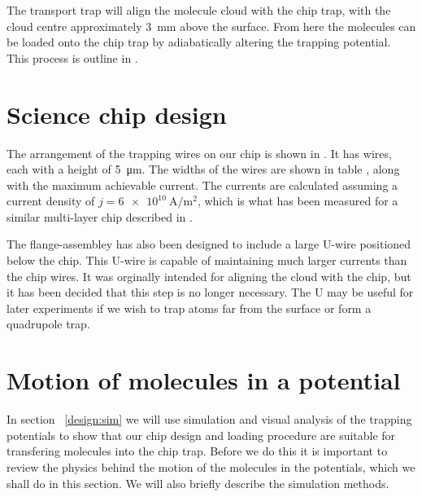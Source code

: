 
The transport trap will align the molecule cloud with the chip trap, with the
cloud centre approximately \SI{3}{\milli\meter} above the surface. From here
the molecules can be loaded onto the chip trap by adiabatically altering the
trapping potential. This process is outline in . 

\section{Science chip design}

The arrangement of the trapping wires on our chip is shown in
. It has  wires, each with a height
of \SI{5}{\micro\meter}. The widths of the wires are shown in table
, along with the maximum achievable current. The
currents are calculated assuming a current density of
$j=\SI{6e10}{\ampere\per\meter\squared}$, which is what has been measured for a
similar multi-layer chip described in .

\begin{figure}[h]
\vspace{0.8cm}
\centering
  \caption{}
  \label{design:fig:chip}
\end{figure}

The flange-assembley  has also been designed to include a
large U-wire positioned below the chip. This U-wire is capable of maintaining
much larger currents than the chip wires. It was orginally intended for
aligning the cloud with the chip, but it has been decided that this step is no
longer necessary. The U may be useful for later experiments if we wish to trap
atoms far from the surface or form a quadrupole trap.

\section{Motion of molecules in a potential}

In section ~\ref{design:sim} we will use simulation and visual analysis of the
trapping potentials to show that our chip design and loading procedure are
suitable for transfering molecules into the chip trap. Before we do this it is
important to review the physics behind the motion of the molecules in the
potentials, which we shall do in this section. We will also briefly describe
the simulation methods.

